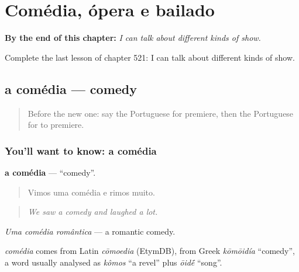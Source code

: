 
\chapter{Comédia, ópera e bailado}
\label{ch:pt-comedia-opera-e-bailado}

\begin{chapteropening}
\textbf{By the end of this chapter:} \emph{I can talk about different kinds of show.}

Complete the last lesson of chapter 521: I can talk about different kinds of show.
\end{chapteropening}

\section[a comédia]{a comédia — comedy}

\label{lesson:PT-C521-comedia}



\begin{quote}
Before the new one: say the Portuguese for premiere, then the Portuguese for to premiere.
\end{quote}

\subsection*{You'll want to know: a comédia}
\textbf{a comédia} — \textquotedblleft{}comedy\textquotedblright{}.

\begin{quote}
Vimos uma comédia e rimos muito.
\end{quote}

\begin{quote}
\emph{We saw a comedy and laughed a lot.}
\end{quote}

\emph{Uma comédia romântica} — a romantic comedy.

\begin{cousinweb}
\emph{comédia} comes from Latin \emph{cōmoedia} (EtymDB), from Greek \emph{kōmōidía} \textquotedblleft{}comedy\textquotedblright{}, a word usually analysed as \emph{kômos} \textquotedblleft{}a revel\textquotedblright{} plus \emph{ōid\'{\={e}}} \textquotedblleft{}song\textquotedblright{}.
\end{cousinweb}

